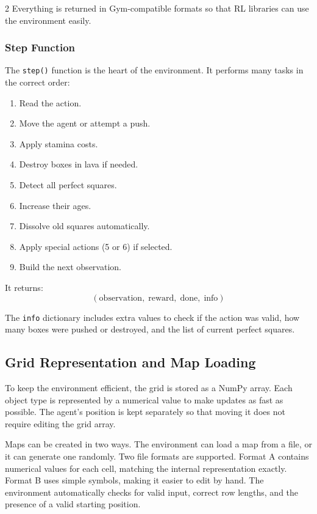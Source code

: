 \documentclass[a4paper]{article}
\begin{document}
\begin{multicols}{2}
Everything is returned in Gym-compatible formats so that RL libraries can use the environment easily.

\subsubsection{Step Function}

The \texttt{step()} function is the heart of the environment. It performs many tasks in the correct order:

\begin{enumerate}
    \item Read the action.
    \item Move the agent or attempt a push.
    \item Apply stamina costs.
    \item Destroy boxes in lava if needed.
    \item Detect all perfect squares.
    \item Increase their ages.
    \item Dissolve old squares automatically.
    \item Apply special actions (5 or 6) if selected.
    \item Build the next observation.
\end{enumerate}

It returns:
\[
(\text{observation},\; \text{reward},\; \text{done},\; \text{info})
\]

The \texttt{info} dictionary includes extra values to check if the action was valid, how many boxes were pushed or destroyed, and the list of current perfect squares.




\subsection{Grid Representation and Map Loading}

To keep the environment efficient, the grid is stored as a NumPy array. Each object type is represented by a numerical value to make updates as fast as possible. The agent’s position is kept separately so that moving it does not require editing the grid array.

Maps can be created in two ways. The environment can load a map from a file, or it can generate one randomly. Two file formats are supported. Format A contains numerical values for each cell, matching the internal representation exactly. Format B uses simple symbols, making it easier to edit by hand. The environment automatically checks for valid input, correct row lengths, and the presence of a valid starting position.


\end{multicols}
\end{document}
